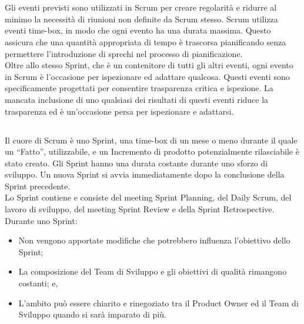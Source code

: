 
\section*{\color{Blue}{Gli Eventi di Scrum}}%
\label{sec:events}
Gli eventi previsti sono utilizzati in Scrum per creare regolarit\`a e ridurre al minimo la necessit\`a di riunioni non 
definite da Scrum stesso. Scrum utilizza eventi time-box, in modo che ogni evento ha una durata massima. Questo assicura che una 
quantit\`a appropriata di tempo è trascorsa pianificando senza permettere l'introduzione di sprechi nel processo di pianificazione. \newline
\\Oltre allo stesso Sprint, che \`e un contenitore di tutti gli altri eventi, ogni evento in Scrum \`e l'occasione per 
ispezionare ed adattare qualcosa. Questi eventi sono specificamente progettati per consentire trasparenza critica e ispezione. 
La mancata inclusione di uno qualsiasi dei risultati di questi eventi riduce la trasparenza ed \`e un'occasione persa per 
ispezionare e adattarsi.

\subsection*{\color{SteelBlue}{Lo Sprint}}%
\label{sec:sprint}

Il cuore di Scrum è uno Sprint, una time-box di un mese o meno durante il quale un ``Fatto'', utilizzabile, e un Incremento di  
prodotto potenzialmente rilasciabile \`e stato creato. Gli Sprint hanno una durata costante durante uno sforzo di sviluppo. Un 
nuova Sprint si avvia immediatamente dopo la conclusione della Sprint precedente. \newline
\\Lo Sprint contiene e consiste del meeting Sprint Planning, del Daily Scrum, del lavoro di sviluppo, del meeting Sprint Review 
e della Sprint Retrospective. \newline
\\Durante uno Sprint:

\begin{itemize}
	\item Non vengono apportate modifiche che potrebbero influenza l'obiettivo dello Sprint;
	\item La composizione del Team di Sviluppo e gli obiettivi di qualit\`a rimangono costanti; e,
	\item L'ambito pu\`o essere chiarito e rinegoziato tra il Product Owner ed il Team di Sviluppo quando si sar\`a imparato di 
	pi\`u.
\end{itemize}

